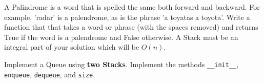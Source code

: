 \documentclass[11pt]{exam}
\begin{document}
\begin{questions}
\newpage
\question[10]  A Palindrome is a word that is spelled the same both forward and backward.  For example, 'radar' is a palendrome, as is the phrase 'a toyatas a toyota'.   Write a function that that takes a word or phrase (with the spaces removed) and returns True if the word is a palendrome and False otherwise.  A Stack must be an integral part of your solution which will be $O(n)$.

\newpage
\question[10] Implement a Queue using \textbf{two Stacks}.  Implement the methods \verb~__init__~, \verb~enqueue~, \verb~dequeue~, and \verb~size~.

\end{questions}
\end{document}
